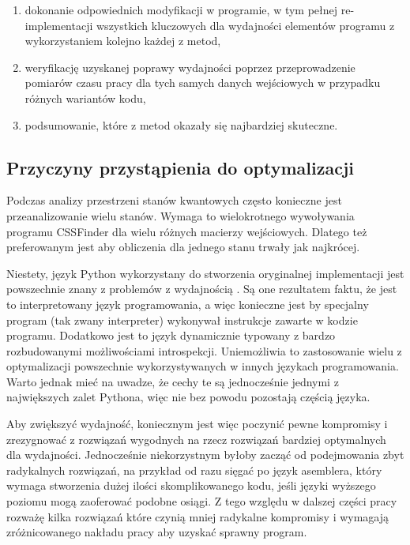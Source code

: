 \documentclass[11pt, a4paper]{article}
\begin{document}
\begin{sloppypar}
\begin{enumerate}
      \item dokonanie odpowiednich modyfikacji w programie, w tym pełnej re-implementacji
        wszystkich kluczowych dla wydajności elementów programu z wykorzystaniem kolejno
        każdej z metod,

      \item weryfikację uzyskanej poprawy wydajności poprzez przeprowadzenie pomiarów czasu
        pracy dla tych samych danych wejściowych w przypadku różnych wariantów kodu,

      \item podsumowanie, które z metod okazały się najbardziej skuteczne.
    \end{enumerate}

    \subsection{Przyczyny przystąpienia do optymalizacji}
    Podczas analizy przestrzeni stanów kwantowych często konieczne jest przeanalizowanie
    wielu stanów. Wymaga to wielokrotnego wywoływania programu CSSFinder dla wielu różnych
    macierzy wejściowych. Dlatego też preferowanym jest aby obliczenia dla jednego stanu
    trwały jak najkrócej.

    Niestety, język Python wykorzystany do stworzenia oryginalnej implementacji jest powszechnie
    znany z problemów z wydajnością \cite{srinath2017python}. Są one rezultatem faktu, że
    jest to interpretowany język programowania, a więc konieczne jest by specjalny
    program (tak zwany interpreter) wykonywał instrukcje zawarte w kodzie programu. Dodatkowo
    jest to język dynamicznie typowany z bardzo rozbudowanymi możliwościami introspekcji.
    Uniemożliwia to zastosowanie wielu z optymalizacji powszechnie wykorzystywanych w
    innych językach programowania. Warto jednak mieć na uwadze, że cechy te są
    jednocześnie jednymi z największych zalet Pythona, więc nie bez powodu pozostają częścią
    języka.

    Aby zwiększyć wydajność, koniecznym jest więc poczynić pewne kompromisy i
    zrezygnować z rozwiązań wygodnych na rzecz rozwiązań bardziej optymalnych dla
    wydajności. Jednocześnie niekorzystnym byłoby zacząć od podejmowania zbyt radykalnych
    rozwiązań, na przykład od razu sięgać po język asemblera, który wymaga stworzenia dużej
    ilości skomplikowanego kodu, jeśli języki wyższego poziomu mogą zaoferować podobne
    osiągi. Z tego względu w dalszej części pracy rozważę kilka rozwiązań które czynią mniej
    radykalne kompromisy i wymagają zróżnicowanego nakładu pracy aby uzyskać sprawny program.


\end{sloppypar}
\end{document}

